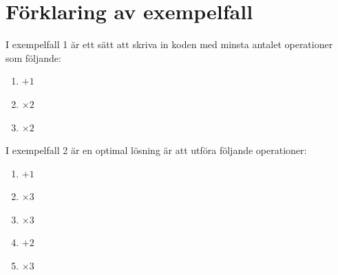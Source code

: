 \section*{Förklaring av exempelfall}
I exempelfall 1 är ett sätt att skriva in koden med minsta antalet operationer som följande:
\begin{enumerate}
  \item $+1$
  \item $\times 2$
  \item $\times 2$
\end{enumerate}

I exempelfall 2 är en optimal lösning är att utföra följande operationer:
\begin{enumerate}
  \item $+1$
  \item $\times 3$
  \item $\times 3$
  \item $+2$
  \item $\times 3$
\end{enumerate}
